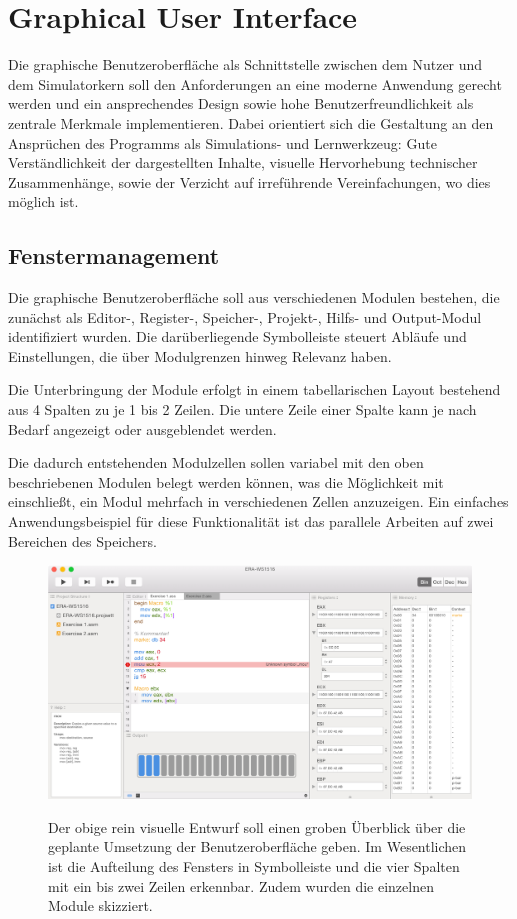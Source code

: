 \chapter{Graphical User Interface}

Die graphische Benutzeroberfläche als Schnittstelle zwischen dem Nutzer und dem Simulatorkern soll den Anforderungen an eine moderne Anwendung gerecht werden und ein ansprechendes Design sowie hohe Benutzerfreundlichkeit als zentrale Merkmale implementieren. Dabei orientiert sich die Gestaltung an den Ansprüchen des Programms als Simulations- und Lernwerkzeug: Gute Verständlichkeit der dargestellten Inhalte, visuelle Hervorhebung technischer Zusammenhänge, sowie der Verzicht auf irreführende Vereinfachungen, wo dies möglich ist.


\section{Fenstermanagement}

Die graphische Benutzeroberfläche soll aus verschiedenen Modulen bestehen, die zunächst als Editor-, Register-, Speicher-, Projekt-, Hilfs- und Output-Modul identifiziert wurden. Die darüberliegende Symbolleiste steuert Abläufe und Einstellungen, die über Modulgrenzen hinweg Relevanz haben.

Die Unterbringung der Module erfolgt in einem tabellarischen Layout bestehend aus 4 Spalten zu je 1 bis 2 Zeilen. Die untere Zeile einer Spalte kann je nach Bedarf angezeigt oder ausgeblendet werden.

Die dadurch entstehenden Modulzellen sollen variabel mit den oben beschriebenen Modulen belegt werden können, was die Möglichkeit mit einschließt, ein Modul mehrfach in verschiedenen Zellen anzuzeigen. Ein einfaches Anwendungsbeispiel für diese Funktionalität ist das parallele Arbeiten auf zwei Bereichen des Speichers.

\begin{figure}
  \includegraphics[width=\textwidth]{../ui/figures/mockup}
  \label{fig:Mockup}
  \caption{Der obige rein visuelle Entwurf soll einen groben Überblick über die geplante Umsetzung der Benutzeroberfläche geben. Im Wesentlichen ist die Aufteilung des Fensters in Symbolleiste und die vier Spalten mit ein bis zwei Zeilen erkennbar. Zudem wurden die einzelnen Module skizziert.}
\end{figure}

